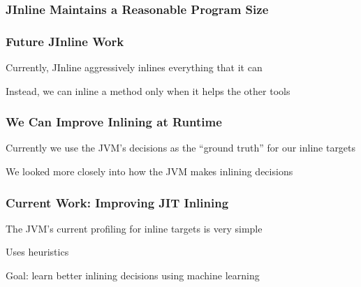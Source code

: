 \documentclass[aspectratio=169]{beamer}
\begin{document}
  \begin{frame}
    \frametitle{JInline Maintains a Reasonable Program Size}

    \centering
  \end{frame}

  \begin{frame}
    \frametitle{Future JInline Work}

    Currently, JInline aggressively inlines everything that it can

    \vspace{2em}

    Instead, we can inline a method only when it helps the other tools
  \end{frame}

  \begin{frame}
    \frametitle{We Can Improve Inlining at Runtime}

    Currently we use the JVM's decisions as the ``ground truth'' for our inline
    targets

    \vspace{2em}

    We looked more closely into how the JVM makes inlining decisions
  \end{frame}

  \begin{frame}
    \frametitle{Current Work: Improving JIT Inlining}
    The JVM's current profiling for inline targets is very simple

    \hspace{1em} Uses heuristics

    \vspace{2em}

    Goal: learn better inlining decisions using machine learning
  \end{frame}
\end{document}
